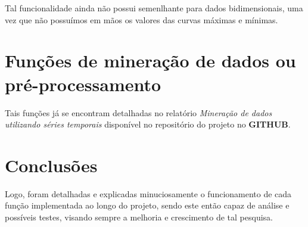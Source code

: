 \documentclass[12pt,letterpaper]{article}
\begin{document}
Tal funcionalidade ainda não possui semenlhante para dados bidimensionais, uma vez que não possuímos em mãos os valores das curvas máximas e mínimas.

\section{Funções de mineração de dados ou pré-processamento}

Tais funções já se encontram detalhadas no relatório \textit{Mineração de dados utilizando séries temporais} disponível no repositório do projeto no \textbf{GITHUB}.

\section{Conclusões}

Logo, foram detalhadas e explicadas minuciosamente o funcionamento de cada função implementada ao longo do projeto, sendo este então capaz de análise e possíveis testes, visando sempre a melhoria e crescimento de tal pesquisa.
\end{document}
